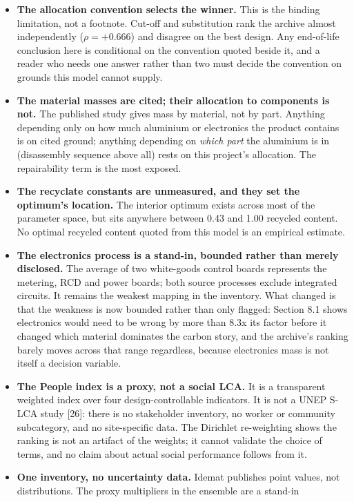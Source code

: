 \documentclass[11pt,a4paper]{article}
\begin{document}
\begin{itemize}
\item \textbf{The allocation convention selects the winner.} This is the
binding limitation, not a footnote. Cut-off and substitution rank the archive
almost independently ($\rho=+0.666$) and disagree on the best design. Any
end-of-life conclusion here is conditional on the convention quoted beside it,
and a reader who needs one answer rather than two must decide the convention
on grounds this model cannot supply.
\item \textbf{The material masses are cited; their allocation to components
is not.} The published study gives mass by material, not by part. Anything
depending only on how much aluminium or electronics the product contains is on
cited ground; anything depending on \emph{which part} the aluminium is in
(disassembly sequence above all) rests on this project's allocation. The
repairability term is the most exposed.
\item \textbf{The recyclate constants are unmeasured, and they set the
optimum's location.} The interior optimum exists across most of the parameter
space, but sits anywhere between 0.43 and 1.00 recycled
content. No optimal recycled content quoted from this model is an empirical
estimate.
\item \textbf{The electronics process is a stand-in, bounded rather than
merely disclosed.} The average of two white-goods control boards represents
the metering, RCD and power boards; both source processes exclude integrated
circuits. It remains the weakest mapping in the inventory. What changed is
that the weakness is now bounded rather than only flagged: Section 8.1 shows
electronics would need to be wrong by more than 8.3x its factor
before it changed which material dominates the carbon story, and the
archive's ranking barely moves across that range regardless, because
electronics mass is not itself a decision variable.
\item \textbf{The People index is a proxy, not a social LCA.} It is a
transparent weighted index over four design-controllable indicators. It is not
a UNEP S-LCA study [26]: there is no stakeholder inventory, no worker or
community subcategory, and no site-specific data. The Dirichlet re-weighting shows the
ranking is not an artifact of the weights; it cannot validate the choice of
terms, and no claim about actual social performance follows from it.
\item \textbf{One inventory, no uncertainty data.} Idemat publishes point
values, not distributions. The proxy multipliers in the ensemble are a stand-in

\end{itemize}
\end{document}
